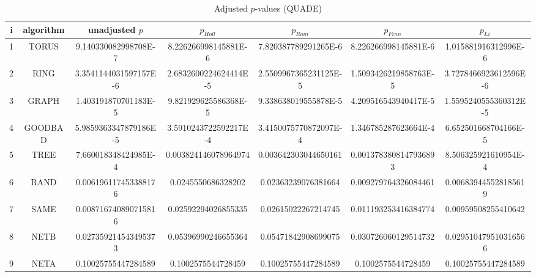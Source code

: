 \documentclass[a4paper,10pt]{article}
\begin{document}
\begin{landscape}
\begin{table}[!htp]
\centering\scriptsize
\caption{Adjusted $p$-values (QUADE)}
\begin{tabular}{ccccccc}
i&algorithm&unadjusted $p$&$p_{Holl}$&$p_{Rom}$&$p_{Finn}$&$p_{Li}$\\
\hline
1& TORUS&9.140330082998708E-7&8.226266998145881E-6&7.820387789291265E-6&8.226266998145881E-6&1.015881916312996E-6\\
2& RING&3.3541144031597157E-6&2.6832600224624414E-5&2.5509967365231125E-5&1.5093426219858763E-5&3.7278466923612596E-6\\
3& GRAPH&1.403191870701183E-5&9.821929625586368E-5&9.338638019555878E-5&4.209516543940417E-5&1.5595240555360312E-5\\
4& GOODBAD&5.9859363347879186E-5&3.5910243722592217E-4&3.4150075770872097E-4&1.346785287623664E-4&6.652501668704166E-5\\
5& TREE&7.660018348424985E-4&0.003824146078964974&0.003642303044650161&0.0013783808147936893&8.506325921610954E-4\\
6& RAND&0.006196117453388176&0.0245550686328202&0.02363239076381664&0.009279764326084461&0.006839445528185619\\
7& SAME&0.008716740890715816&0.02592294026855335&0.02615022267214745&0.011193253416384774&0.00959508255410642\\
8& NETB&0.027359214543495373&0.05396990246655364&0.05471842908699075&0.030726060129514732&0.029510479510316566\\
9& NETA&0.10025755447284589&0.1002575544728459&0.10025755447284589&0.1002575544728459&0.10025755447284589\\
\hline
\end{tabular}
\end{table}

\end{landscape}
\end{document}
